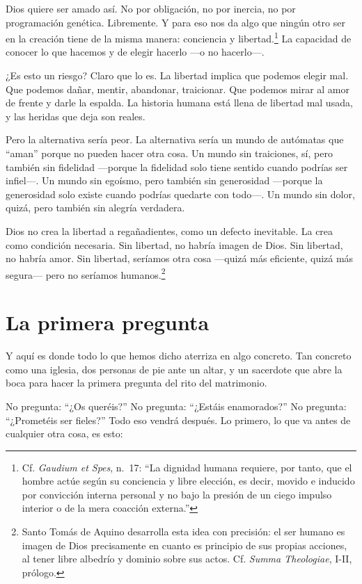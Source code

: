 Dios quiere ser amado así. No por obligación, no por inercia, no por programación genética. Libremente. Y para eso nos da algo que ningún otro ser en la creación tiene de la misma manera: conciencia y libertad.\footnote{Cf. \textit{Gaudium et Spes}, n.~17: ``La dignidad humana requiere, por tanto, que el hombre actúe según su conciencia y libre elección, es decir, movido e inducido por convicción interna personal y no bajo la presión de un ciego impulso interior o de la mera coacción externa.''} La capacidad de conocer lo que hacemos y de elegir hacerlo ---o no hacerlo---.

¿Es esto un riesgo? Claro que lo es. La libertad implica que podemos elegir mal. Que podemos dañar, mentir, abandonar, traicionar. Que podemos mirar al amor de frente y darle la espalda. La historia humana está llena de libertad mal usada, y las heridas que deja son reales.

Pero la alternativa sería peor. La alternativa sería un mundo de autómatas que ``aman'' porque no pueden hacer otra cosa. Un mundo sin traiciones, sí, pero también sin fidelidad ---porque la fidelidad solo tiene sentido cuando podrías ser infiel---. Un mundo sin egoísmo, pero también sin generosidad ---porque la generosidad solo existe cuando podrías quedarte con todo---. Un mundo sin dolor, quizá, pero también sin alegría verdadera.

Dios no crea la libertad a regañadientes, como un defecto inevitable. La crea como condición necesaria. Sin libertad, no habría imagen de Dios. Sin libertad, no habría amor. Sin libertad, seríamos otra cosa ---quizá más eficiente, quizá más segura--- pero no seríamos humanos.\footnote{Santo Tomás de Aquino desarrolla esta idea con precisión: el ser humano es imagen de Dios precisamente en cuanto es principio de sus propias acciones, al tener libre albedrío y dominio sobre sus actos. Cf. \textit{Summa Theologiae}, I-II, prólogo.}

\section{La primera pregunta}

Y aquí es donde todo lo que hemos dicho aterriza en algo concreto. Tan concreto como una iglesia, dos personas de pie ante un altar, y un sacerdote que abre la boca para hacer la primera pregunta del rito del matrimonio.

No pregunta: ``¿Os queréis?'' No pregunta: ``¿Estáis enamorados?'' No pregunta: ``¿Prometéis ser fieles?'' Todo eso vendrá después. Lo primero, lo que va antes de cualquier otra cosa, es esto:


